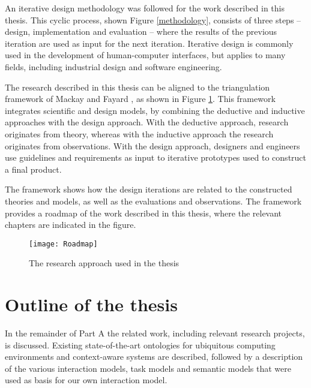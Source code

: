 
An iterative design methodology \cite{Larman2003} was followed for the work described in this thesis. This cyclic process, shown Figure \ref{methodology}, consists of three steps -- design, implementation and evaluation -- where the results of the previous iteration are used as input for the next iteration. Iterative design is commonly used in the development of human-computer interfaces, but applies to many fields, including industrial design and software engineering.

The research described in this thesis can be aligned to the triangulation framework of Mackay and Fayard \cite{Mackay1997}, as shown in Figure \ref{roadmap}. This framework integrates scientific and design models, by combining the deductive and inductive approaches with the design approach. With the deductive approach, research originates from theory, whereas with the inductive approach the research originates from observations. With the design approach, designers and engineers use guidelines and requirements as input to iterative prototypes used to construct a final product.

The framework shows how the design iterations are related to the constructed theories and models, as well as the evaluations and observations. The framework provides a roadmap of the work described in this thesis, where the relevant chapters are indicated in the figure.
  
\begin{figure}
\centerline{
\texttt{[image: Roadmap]}}
\caption{The research approach used in the thesis}
\label{roadmap}
\end{figure}


\section{Outline of the thesis}

In the remainder of Part A the related work, including relevant research projects, is discussed. Existing state-of-the-art ontologies for ubiquitous computing environments and context-aware systems are described, followed by a description of the various interaction models, task models and semantic models that were used as basis for our own interaction model. 

